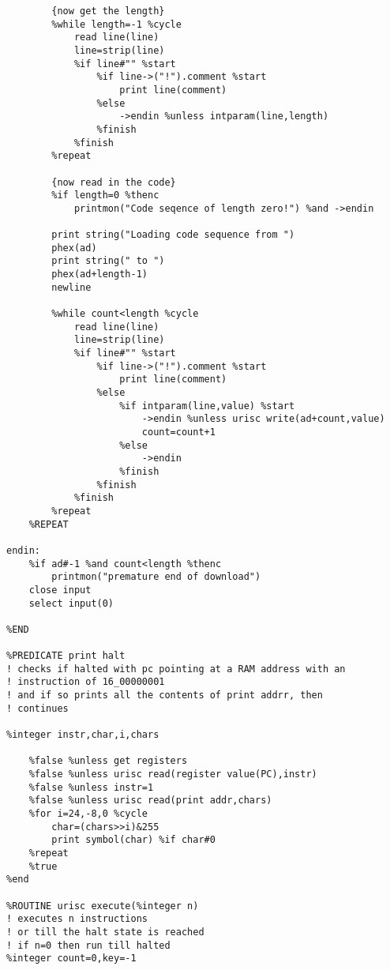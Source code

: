 \begin{verbatim}
        {now get the length}
        %while length=-1 %cycle
            read line(line)
            line=strip(line)
            %if line#"" %start
                %if line->("!").comment %start
                    print line(comment)
                %else
                    ->endin %unless intparam(line,length)
                %finish
            %finish
        %repeat
    
        {now read in the code}
        %if length=0 %thenc
            printmon("Code seqence of length zero!") %and ->endin

        print string("Loading code sequence from ")
        phex(ad)
        print string(" to ")
        phex(ad+length-1)
        newline

        %while count<length %cycle
            read line(line)
            line=strip(line)
            %if line#"" %start
                %if line->("!").comment %start
                    print line(comment)
                %else
                    %if intparam(line,value) %start
                        ->endin %unless urisc write(ad+count,value)
                        count=count+1
                    %else
                        ->endin
                    %finish
                %finish
            %finish
        %repeat
    %REPEAT

endin:
    %if ad#-1 %and count<length %thenc
        printmon("premature end of download")
    close input
    select input(0)

%END

%PREDICATE print halt
! checks if halted with pc pointing at a RAM address with an 
! instruction of 16_00000001
! and if so prints all the contents of print addrr, then
! continues

%integer instr,char,i,chars

    %false %unless get registers
    %false %unless urisc read(register value(PC),instr)
    %false %unless instr=1
    %false %unless urisc read(print addr,chars)
    %for i=24,-8,0 %cycle
        char=(chars>>i)&255
        print symbol(char) %if char#0
    %repeat
    %true
%end

%ROUTINE urisc execute(%integer n)
! executes n instructions
! or till the halt state is reached
! if n=0 then run till halted
%integer count=0,key=-1


\end{verbatim}
